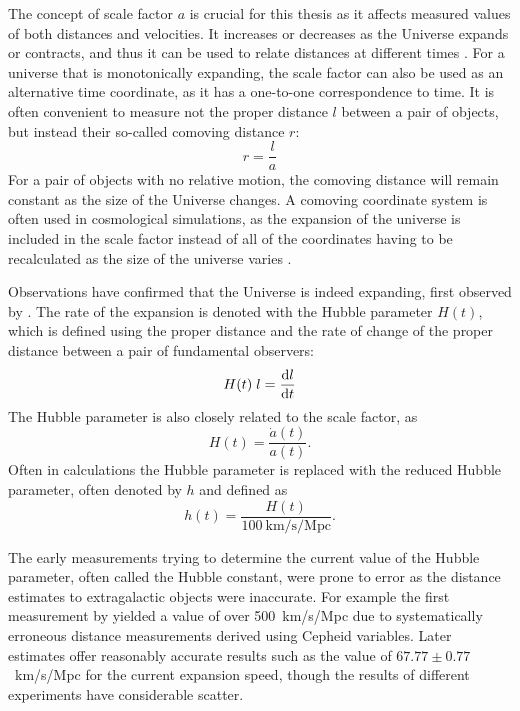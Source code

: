 \documentclass[english, twoside]{HYgradu}
\begin{document}
The concept of scale factor $a$ is crucial for this thesis as it affects measured values of both distances and velocities. It increases or decreases as the Universe expands or contracts, and thus it can be used to relate distances at different times \citep{mo2010galaxy}. For a universe that is monotonically expanding, the scale factor can also be used as an alternative time coordinate, as it has a one-to-one correspondence to time. It is often convenient to measure not the proper distance $l$ between a pair of objects, but instead their so-called comoving distance $r$: \citep{mo2010galaxy}
\begin{equation} \label{comoving}
r = \frac{l}{a}
\end{equation}
For a pair of objects with no relative motion, the comoving distance will remain constant as the size of the Universe changes. A comoving coordinate system is often used in cosmological simulations, as the expansion of the universe is included in the scale factor instead of all of the coordinates having to be recalculated as the size of the universe varies \citep{griebel1002numerical}.

Observations have confirmed that the Universe is indeed expanding, first observed by \citet{hubble1929relation}. The rate of the expansion is denoted with the Hubble parameter $H(t)$, which is defined using the proper distance and the rate of change of the proper distance between a pair of fundamental observers:
\begin{equation}
H(t)\; l = \dv{l}{t}
\end{equation}
The Hubble parameter is also closely related to the scale factor, as \citep{mo2010galaxy}
\begin{equation}\label{reducedhubble}
H(t) = \frac{\dot{a}(t)}{a(t)}.
\end{equation}
Often in calculations the Hubble parameter is replaced with the reduced Hubble parameter, often denoted by $h$ and defined as \citep{montgomery2012introduction}
\begin{equation}
h(t) = \frac{H(t)}{100\ \mathrm{km/s/Mpc}}.
\end{equation}


The early measurements trying to determine the current value of the Hubble parameter, often called the Hubble constant, were prone to error as the distance estimates to extragalactic objects were inaccurate. For example the first measurement by \citet{hubble1929relation} yielded a value of over 500~km/s/Mpc due to systematically erroneous distance measurements derived using Cepheid variables. Later estimates offer reasonably accurate results such as the \citet{planck2014resultsXVI} value of $67.77 \pm 0.77$~km/s/Mpc for the current expansion speed, though the results of different experiments have considerable scatter.
\end{document}
